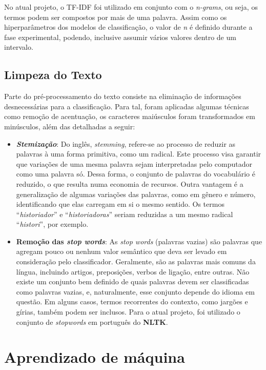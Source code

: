 No atual projeto, o TF-IDF foi utilizado em conjunto com o \textit{n-grams}, ou seja, os termos podem ser compostos por mais de uma palavra. Assim como os hiperparâmetros dos modelos de classificação, o valor de \textit{n} é definido durante a fase experimental, podendo, inclusive assumir vários valores dentro de um intervalo.

\subsection{Limpeza do Texto}
\label{limpeza}

Parte do pré-processamento do texto consiste na eliminação de informações desnecessárias para a classificação. Para tal, foram aplicadas algumas técnicas como remoção de acentuação, os caracteres maiúsculos foram transformados em minúsculos, além das detalhadas a seguir:

\begin{itemize}
\item \textbf{\textit{Stemização}}: Do inglês, \textit{stemming}, refere-se ao processo de reduzir as palavras à uma forma primitiva, como um radical. Este processo visa garantir que variações de uma mesma palavra sejam interpretadas pelo computador como uma palavra só. Dessa forma, o conjunto de palavras do vocabulário é reduzido, o que resulta numa economia de recursos. Outra vantagem é a generalização de algumas variações das palavras, como em gênero e número, identificando que elas carregam em si o mesmo sentido. Os termos “\textit{historiador}” e “\textit{historiadoras}” seriam reduzidas a um mesmo radical “\textit{histori}”, por exemplo.

\item \textbf{Remoção das \textit{stop words}}: As \textit{stop words} (palavras vazias) são palavras que agregam pouco ou nenhum valor semântico que deva ser levado em consideração pelo classificador. Geralmente, são as palavras mais comuns da língua, incluindo artigos, preposições, verbos de ligação, entre outras. Não existe um conjunto bem definido de quais palavras devem ser classificadas como palavras vazias, e, naturalmente, esse conjunto depende do idioma em questão. Em alguns casos, termos recorrentes do contexto, como jargões e gírias, também podem ser inclusos. Para o atual projeto, foi utilizado o conjunto de \textit{stopwords} em português do \textbf{NLTK}.
\end{itemize}

\section{Aprendizado de máquina}

